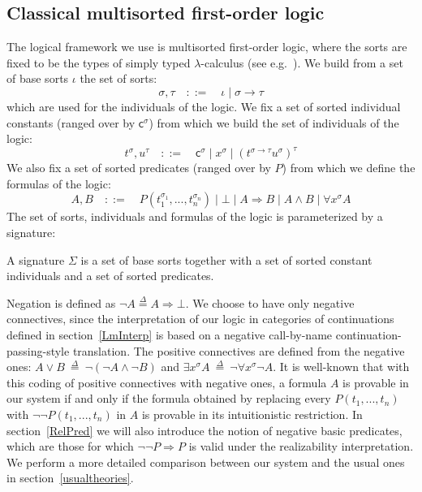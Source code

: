\documentclass{CSML}
\renewcommand{\ldots}{...}
\newcommand*\Def{\mathrel{\overset{\Delta}{=}}}
\newcommand*\GramDef{\quad\mathrel{::=}\quad}
\newcommand*\BarSep{\mathrel{|}}
\newcommand*\SortBase\iota
\newcommand*\SortTo\to
\newcommand*\SortA{\sigma}
\newcommand*\SortB{\tau}
\newcommand*\LogSortedTerm[2]{#1^{#2}}
\newcommand*\LogTermA{t}
\newcommand*\LogTermB{u}
\newcommand*\LogVarA{x}
\newcommand*\LogConst[1]{\mathsf{#1}}
\newcommand*\LogConstA{\LogConst{c}}
\newcommand*\LogImp{\mathbin{\Rightarrow}}
\newcommand*\LogAnd{\mathbin{\wedge}}
\newcommand*\LogBot\bot
\newcommand*\LogFormA{A}
\newcommand*\LogFormB{B}
\newcommand*\LogPredA{P}
\begin{document}
\subsection{Classical multisorted first-order logic}
The logical framework we use is multisorted first-order logic, where the sorts are fixed to be the types of simply typed $\lambda$-calculus (see e.g.~\cite{TroelstraVanDalenConstructivism}). We build from a set of base sorts $\SortBase$ the set of sorts:
$$\SortA,\SortB\GramDef\SortBase\BarSep\SortA\SortTo\SortB$$
which are used for the individuals of the logic. We fix a set of sorted individual constants (ranged over by $\LogSortedTerm{\LogConstA}{\SortA}$) from which we build the set of individuals of the logic:
$$\LogSortedTerm{\LogTermA}{\SortA},\LogSortedTerm{\LogTermB}{\SortB}\GramDef\LogSortedTerm{\LogConstA}{\SortA}\BarSep\LogSortedTerm{\LogVarA}{\SortA}\BarSep\LogSortedTerm{\left(\LogSortedTerm{\LogTermA}{\SortA\SortTo\SortB}\LogSortedTerm{\LogTermB}{\SortA}\right)}{\SortB}$$
We also fix a set of sorted predicates (ranged over by $\LogPredA$) from which we define the formulas of the logic:
$$\LogFormA,\LogFormB\GramDef\LogPredA\left(\LogSortedTerm{\LogTermA_1}{\SortA_1},\ldots,\LogSortedTerm{\LogTermA_n}{\SortA_n}\right)\BarSep\LogBot\BarSep\LogFormA\LogImp\LogFormB\BarSep\LogFormA\LogAnd\LogFormB\BarSep\forall\LogSortedTerm{\LogVarA}{\SortA}\LogFormA$$
The set of sorts, individuals and formulas of the logic is parameterized by a signature:
\begin{defi}
A signature $\Sigma$ is a set of base sorts together with a set of sorted constant individuals and a set of sorted predicates.
\end{defi}
Negation is defined as $\neg\LogFormA\Def\LogFormA\LogImp\LogBot$. We choose to have only negative connectives, since the interpretation of our logic in categories of continuations defined in section~\ref{LmInterp} is based on a negative call-by-name continuation-passing-style translation. The positive connectives are defined from the negative ones: $\LogFormA\vee\LogFormB\ \Def\ \neg\left(\neg\LogFormA\LogAnd\neg\LogFormB\right)$ and $\exists\LogSortedTerm{\LogVarA}{\SortA}\LogFormA\ \Def\ \neg\forall\LogSortedTerm{\LogVarA}{\SortA}\neg\LogFormA$. It is well-known that with this coding of positive connectives with negative ones, a formula $\LogFormA$ is provable in our system if and only if the formula obtained by replacing every $\LogPredA\left(\LogTermA_1,\ldots,\LogTermA_n\right)$ with $\neg\neg\LogPredA\left(\LogTermA_1,\ldots,\LogTermA_n\right)$ in $\LogFormA$ is provable in its intuitionistic restriction. In section~\ref{RelPred} we will also introduce the notion of negative basic predicates, which are those for which $\neg\neg\LogPredA\LogImp\LogPredA$ is valid under the realizability interpretation. We perform a more detailed comparison between our system and the usual ones in section~\ref{usualtheories}.\par
\end{document}

